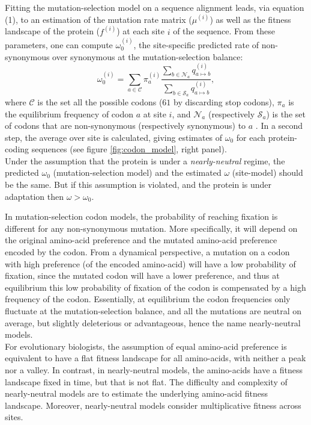 Fitting the mutation-selection model on a sequence alignment leads, via equation (1), to an estimation of the mutation rate matrix ($\mu^{(i)}$) as well as the fitness landscape of the protein ($f^{(i)}$) at each site $i$ of the sequence. From these parameters, one can compute $\omega_{0}^{(i)}$, the site-specific predicted rate of non-synonymous over \gls{synonymous} at the mutation-selection balance: 
\begin{equation}
\omega_{0}^{(i)} = \sum_{a \in  \mathcal{C}} \pi_a^{(i)}  \dfrac{\sum_{b \in  \mathcal{N}_a} q_{a \mapsto b}^{(i)}}{\sum_{b \in \mathcal{S}_a} q_{a \mapsto b}^{(i)}},
\end{equation}
where $\mathcal{C}$ is the set all the possible codons ($61$ by discarding stop codons), $\pi_a$ is the equilibrium frequency of \gls{codon} $a$ at site $i$, and $\mathcal{N}_a$ (respectively $\mathcal{S}_a$) is the set of codons that are non-synonymous (respectively synonymous) to $a$  \citep{spielman_relationship_2015, rodrigue_site-heterogeneous_2014}. In a second step, the average over site is calculated, giving estimates of $\omega_0$ for each protein-coding sequences (see figure \ref{fig:codon_model}, right panel). \\

Under the assumption that the protein is under a \textit{nearly-neutral} regime,  the predicted $\omega_0$ (mutation-selection model) and the estimated $\omega$ (site-model) should be the same. But if this assumption is violated, and the protein is under adaptation then $\omega > \omega_0$.


In mutation-selection \gls{codon} models, the probability of reaching fixation is different for any non-synonymous mutation.
More specifically, it will depend on the original amino-acid preference and the mutated amino-acid preference encoded by the \gls{codon}.
From a dynamical perspective, a mutation on a \gls{codon} with high preference (of the encoded amino-acid) will have a low probability of fixation, since the mutated \gls{codon} will have a lower preference, and thus at equilibrium this low probability of fixation of the \gls{codon} is compensated by a high frequency of the \gls{codon}.
Essentially, at equilibrium the \gls{codon} frequencies only fluctuate at the mutation-selection balance, and all the mutations are \gls{neutral} on average, but slightly deleterious or advantageous, hence the name \gls{nearly-neutral} models.\\
For evolutionary biologists, the assumption of equal amino-acid preference is equivalent to have a flat fitness landscape for all amino-acids, with neither a peak nor a valley.
In contrast, in \gls{nearly-neutral} models, the amino-acids have a fitness landscape fixed in time, but that is not flat.
The difficulty and complexity of \gls{nearly-neutral} models are to estimate the underlying amino-acid fitness landscape.
Moreover, \gls{nearly-neutral} models consider multiplicative fitness across sites.

